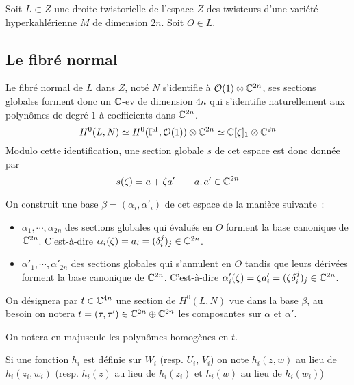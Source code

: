 \documentclass[a4paper,10pt,draft]{article}
\begin{document}
Soit $L \subset Z$ une droite twistorielle de l'espace $Z$ des twisteurs d'une variété hyperkahlérienne $M$ de dimension $2n$. Soit $O \in L$.

\subsection{Le fibré normal}
Le fibré normal de $L$ dans $Z$, noté $N$ s'identifie à $\mathcal{O}(1) \otimes \mathbb{C}^{2n}$, ses sections globales forment donc un $\mathbb{C}$-ev de dimension $4n$ qui s'identifie naturellement aux polynômes de degré $1$ à coefficients dans $\mathbb{C}^{2n}$.
\begin{equation}
H^0(L,N) \simeq H^0(\mathbb{P}^1, \mathcal{O}(1)) \otimes \mathbb{C}^{2n} \simeq \mathbb{C}[\zeta]_1 \otimes \mathbb{C}^{2n}
\end{equation}
Modulo cette identification, une section globale $s$ de cet espace est donc donnée par
\begin{equation}
s(\zeta) = a + \zeta a' \qquad  a,a' \in \mathbb{C}^{2n}
\end{equation}

On construit une base $\beta = (\alpha_i, \alpha'_i)$ de cet espace de la manière suivante~:
\begin{itemize}
\item $\alpha_1, \cdots, \alpha_{2n}$ des sections globales qui évalués en $O$ forment la base canonique de $\mathbb{C}^{2n}$.
C'est-à-dire $\alpha_i(\zeta) = a_i = (\delta_i^j)_j \in \mathbb{C}^{2n}$. 
\item $\alpha'_1, \cdots, \alpha'_{2n}$ des sections globales qui s'annulent en $O$ tandis que leurs dérivées forment la base canonique de $\mathbb{C}^{2n}$.
C'est-à-dire $\alpha'_i(\zeta) = \zeta a'_i = (\zeta \delta_i^j)_j \in \mathbb{C}^{2n}$. 
\end{itemize}

On désignera par $t \in \mathbb{C}^{4n}$ une section de $H^0(L,N)$ vue dans la base $\beta$, au besoin on notera $t = (\tau, \tau') \in \mathbb{C}^{2n} \oplus \mathbb{C}^{2n}$ les composantes sur $\alpha$ et $\alpha'$.

On notera en majuscule les polynômes homogènes en $t$.


Si une fonction $h_i$ est définie sur $W_i$ (resp. $U_i$, $V_i$) on note $h_i(z,w)$ au lieu de $h_i(z_i,w_i)$ (resp. $h_i(z)$ au lieu de $h_i(z_i)$ et $h_i(w)$ au lieu de $h_i(w_i)$)
\end{document}
